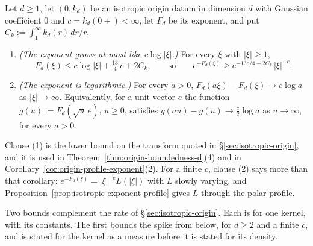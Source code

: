 \begin{lemma}\label{lem:isotropic-exponent-log}
Let $d \ge 1$, let $(0,k_d)$ be an isotropic origin datum in dimension $d$ with Gaussian
coefficient $0$ and $c = k_d(0{+}) < \infty$, let $F_d$ be its exponent, and put
$C_k := \int_1^\infty k_d(r)\,dr/r$.
\begin{enumerate}
\item \emph{(The exponent grows at most like $c\log|\xi|$.)} For every $\xi$ with $|\xi| \ge 1$,
\[
  F_d(\xi) \le c\log|\xi| + \tfrac{13}{4}\,c + 2C_k ,
  \qquad\text{so}\qquad
  e^{-F_d(\xi)} \ge e^{-13c/4 - 2C_k}\,|\xi|^{-c} .
\]
\item \emph{(The exponent is logarithmic.)} For every $a > 0$,
$F_d(a\xi) - F_d(\xi) \to c\log a$ as $|\xi| \to \infty$. Equivalently, for a unit vector $e$ the
function $g(u) := F_d(\sqrt u\,e)$, $u \ge 0$, satisfies $g(au) - g(u) \to \tfrac c2\log a$ as
$u \to \infty$, for every $a > 0$.
\end{enumerate}
\end{lemma}

Clause (1) is the lower bound on the transform quoted in \S\ref{sec:isotropic-origin}, and it
is used in Theorem~\ref{thm:origin-boundedness-d}(4) and in
Corollary~\ref{cor:origin-profile-exponent}(2). For a finite $c$, clause (2) says more than that
corollary: $e^{-F_d(\xi)} = |\xi|^{-c}L(|\xi|)$ with $L$ slowly varying, and
Proposition~\ref{prop:isotropic-exponent-profile} gives $L$ through the polar profile.

Two bounds complement the rate of \S\ref{sec:isotropic-origin}. Each is for one kernel, with
its constants. The first bounds the spike from below, for $d \ge 2$ and a finite $c$, and is
stated for the kernel as a measure before it is stated for its density.

